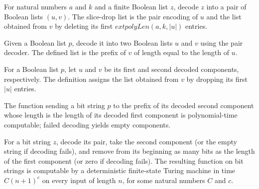\begin{definition}
\label{Randomized.sliceDrop}
\leanok
{}
For natural numbers $a$ and $k$ and a finite Boolean list $z$, decode $z$ into a pair of
Boolean lists $(u,v)$. The slice-drop list is the pair encoding of $u$ and the list
obtained from $v$ by deleting its first $	ext{polyLen}(a,k,|u|)$ entries.
\end{definition}

\begin{definition}
\label{Randomized.takePrefixByLen}
\leanok
{}
Given a Boolean list $p$, decode it into two Boolean lists $u$ and $v$ using the pair
decoder. The defined list is the prefix of $v$ of length equal to the length of $u$.
\end{definition}

\begin{definition}
\label{Randomized.dropPrefixByLen}
\leanok
{}
For a Boolean list $p$, let $u$ and $v$ be its first and second decoded components,
respectively. The definition assigns the list obtained from $v$ by dropping its first
$|u|$ entries.
\end{definition}

\begin{theorem}
\label{Randomized.polyTimeComputable_takePrefixByLen}
\leanok
{}
The function sending a bit string $p$ to the prefix of its decoded second component
whose length is the length of its decoded first component is polynomial-time computable;
failed decoding yields empty components.
\end{theorem}

\begin{theorem}
\label{Randomized.polyTimeComputable_dropPrefixByLen}
\leanok
{}
For a bit string $z$, decode its pair, take the second component (or the empty string if
decoding fails), and remove from its beginning as many bits as the length of the first
component (or zero if decoding fails). The resulting function on bit strings is
computable by a deterministic finite-state Turing machine in time $C(n+1)^c$ on every
input of length $n$, for some natural numbers $C$ and $c$.
\end{theorem}

